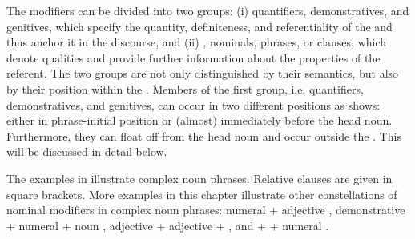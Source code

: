The modifiers can be divided into two groups: (i) quantifiers, demonstratives, and genitives, which specify the quantity, definiteness, and referentiality of the  and thus anchor it in the discourse, and (ii) , nominals, phrases, or clauses, which denote qualities and provide further information about the properties of the referent. The two groups are not only distinguished by their semantics, but also by their position within the . Members of the first group, i.e. quantifiers, demonstratives, and genitives, can occur in two different positions as  shows: either in phrase-initial position or (almost) immediately before the head noun. Furthermore, they can float off from the head noun and occur outside the . This will be discussed in detail below.

The examples in  illustrate complex noun phrases. Relative clauses are given in square brackets. More examples in this chapter illustrate other constellations of nominal modifiers in complex noun phrases: numeral + adjective , demonstrative + numeral + noun , adjective + adjective +  , and  +  + numeral .

